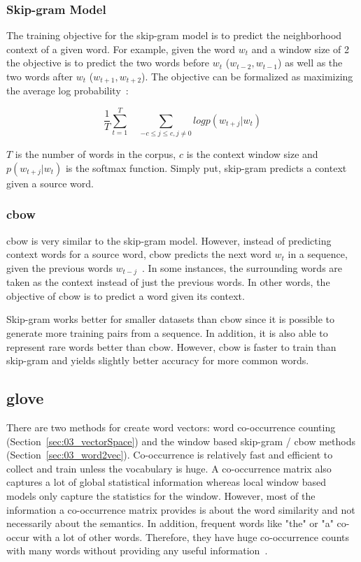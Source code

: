 \subsubsection*{Skip-gram Model}

The training objective for the skip-gram model is to predict the neighborhood context of a given word. For example, given the word $w_t$ and a window size of 2 the objective is to predict the two words before $w_t$ {($w_{t-2}, w_{t-1}$)} as well as the two words after $w_t$ {($w_{t+1}, w_{t+2}$)}. The objective can be formalized as maximizing the average log probability~\cite{Mikolov2013e}:

\begin{equation}
\frac{1}{T} \sum_{t=1}^T \quad \sum_{-c\leq j \leq c, j \neq 0} log p(w_{t+j} | w_t)
\end{equation}

$T$ is the number of words in the corpus, $c$ is the context window size and $p(w_{t+j} | w_t)$ is the softmax function. Simply put, skip-gram predicts a context given a source word.

\subsubsection*{\acrfull{cbow}}

\gls{cbow} is very similar to the skip-gram model. However, instead of predicting context words for a source word, \gls{cbow} predicts the next word $w_{t}$ in a sequence, given the previous words $w_{t-j}$~\cite{Mikolov2013c}. In some instances, the surrounding words are taken as the context instead of just the previous words. In other words, the objective of \gls{cbow} is to predict a word given its context.
\medskip

Skip-gram works better for smaller datasets than \gls{cbow} since it is possible to generate more training pairs from a sequence. In addition, it is also able to represent rare words better than \gls{cbow}. However, \gls{cbow} is faster to train than skip-gram and yields slightly better accuracy for more common words.

\subsection{\acrfull{glove}}

There are two methods for create word vectors: word co-occurrence counting {(Section~\ref{sec:03_vectorSpace})} and the window based skip-gram / \gls{cbow} methods {(Section~\ref{sec:03_word2vec})}. Co-occurrence is relatively fast and efficient to collect and train unless the vocabulary is huge. A co-occurrence matrix also captures a lot of global statistical information whereas local window based models only capture the statistics for the window. However, most of the information a co-occurrence matrix provides is about the word similarity and not necessarily about the semantics. In addition, frequent words like "the" or "a" co-occur with a lot of other words. Therefore, they have huge co-occurrence counts with many words without providing any useful information~\cite{Pennington2014a}.

